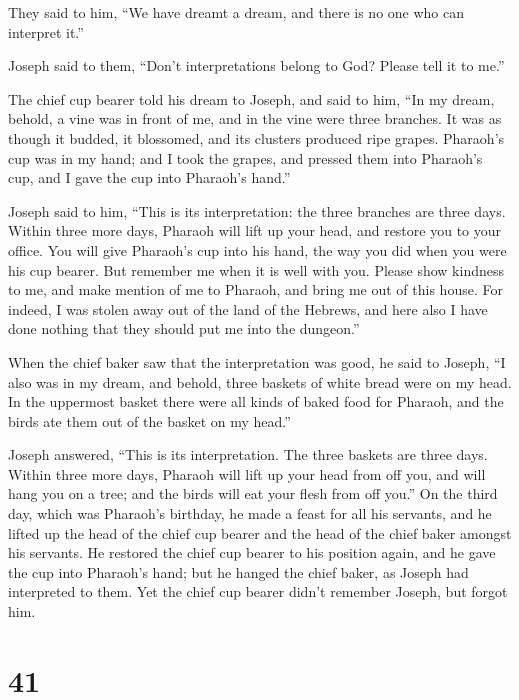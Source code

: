 They said to him, ``We have dreamt a dream, and there is
no one who can interpret it.''

Joseph said to them, ``Don't interpretations belong to God? Please tell
it to me.''

 The chief cup bearer told his dream to Joseph, and said
to him, ``In my dream, behold, a vine was in front of me,
 and in the vine were three branches. It was as though it
budded, it blossomed, and its clusters produced ripe grapes.
 Pharaoh's cup was in my hand; and I took the grapes, and
pressed them into Pharaoh's cup, and I gave the cup into Pharaoh's
hand.''

 Joseph said to him, ``This is its interpretation: the
three branches are three days.  Within three more days,
Pharaoh will lift up your head, and restore you to your office. You will
give Pharaoh's cup into his hand, the way you did when you were his cup
bearer.  But remember me when it is well with you. Please
show kindness to me, and make mention of me to Pharaoh, and bring me out
of this house.  For indeed, I was stolen away out of the
land of the Hebrews, and here also I have done nothing that they should
put me into the dungeon.''

 When the chief baker saw that the interpretation was
good, he said to Joseph, ``I also was in my dream, and behold, three
baskets of white bread were on my head.  In the uppermost
basket there were all kinds of baked food for Pharaoh, and the birds ate
them out of the basket on my head.''

 Joseph answered, ``This is its interpretation. The three
baskets are three days.  Within three more days, Pharaoh
will lift up your head from off you, and will hang you on a tree; and
the birds will eat your flesh from off you.''  On the
third day, which was Pharaoh's birthday, he made a feast for all his
servants, and he lifted up the head of the chief cup bearer and the head
of the chief baker amongst his servants.  He restored the
chief cup bearer to his position again, and he gave the cup into
Pharaoh's hand;  but he hanged the chief baker, as Joseph
had interpreted to them.  Yet the chief cup bearer didn't
remember Joseph, but forgot him.

\hypertarget{section-40}{%
\section{41}\label{section-40}}

